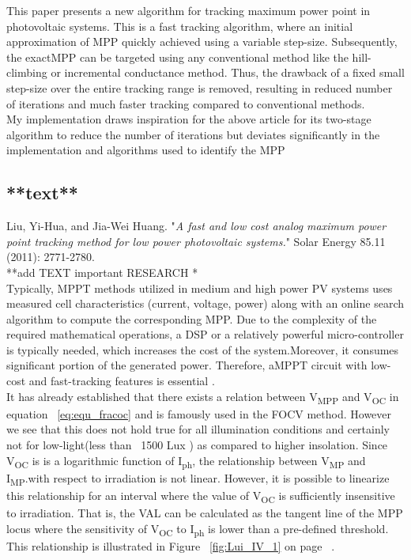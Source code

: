 {This paper presents a new algorithm for tracking maximum power point in photovoltaic systems. This is a fast tracking algorithm, where an initial approximation of \ac{MPP} quickly achieved using a variable step-size. Subsequently, the exact\ac{MPP} can be targeted using any conventional method like the hill-climbing or incremental conductance method. Thus, the drawback of a fixed small step-size over the entire tracking range is removed, resulting in reduced number of iterations and much faster tracking compared to conventional methods. \\

My implementation draws inspiration for the above article for its  two-stage algorithm to reduce the number of iterations but deviates significantly in the implementation and algorithms used to identify the \ac{MPP} 

\subsection{**text**\cite{liu2011fast}}

Liu, Yi-Hua, and Jia-Wei Huang. "\textit{A fast and low cost analog maximum power point tracking method for low power photovoltaic systems.}" Solar Energy 85.11 (2011): 2771-2780.\\

**add TEXT important RESEARCH * \\

Typically, MPPT methods utilized in medium and high power PV systems uses measured cell characteristics (current, voltage, power) along with an online search algorithm to compute the corresponding \ac{MPP}. Due to the complexity of the required mathematical operations, a \ac{DSP} or a relatively powerful micro-controller is typically needed, which increases the cost of the system.Moreover, it consumes significant portion of the generated power. Therefore, a\ac{MPPT} circuit with low-cost and fast-tracking features is essential .\\

It has already established that there exists a relation between V\textsubscript{MPP} and V\textsubscript{OC} in equation ~\ref{eq:equ_fracoc} and is famously used in the \ac{FOCV} method. However we see that this does not hold true for all illumination conditions and certainly not for low-light(less than ~1500 Lux ) as compared to higher insolation. Since V\textsubscript{OC} is is a logarithmic function of I\textsubscript{ph}, the relationship between  V\textsubscript{MP} and I\textsubscript{MP}.with respect to irradiation is not linear. However, it is possible to linearize this relationship for an interval where the value of V\textsubscript{OC} is sufficiently insensitive to irradiation. That is, the  \ac{VAL} can be calculated as the tangent line of the \ac{MPP} locus where the sensitivity of V\textsubscript{OC} to I\textsubscript{ph} is lower than a pre-defined threshold. This relationship is illustrated in Figure ~\ref{fig:Lui_IV_1} on page ~\pageref{fig:Lui_IV_1}.


}
